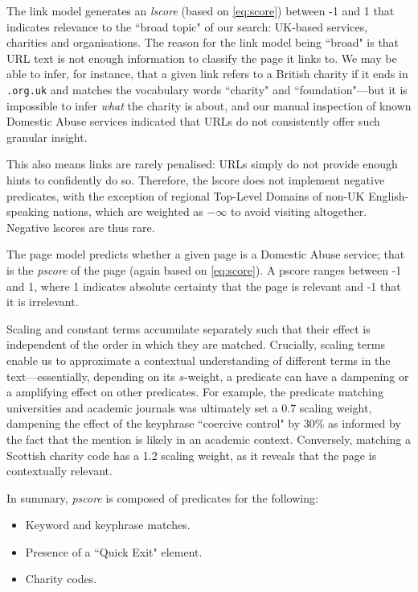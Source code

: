 \documentclass[conference]{IEEEtran}
\begin{document}
The link model generates an \textit{lscore} (based on \cref{eq:score}) between -1 and 1 that indicates relevance to the ``broad topic" of our search: UK-based services, charities and organisations. 
The reason for the link model being ``broad" is that URL text is not enough information to classify the page it links to. 
We may be able to infer, for instance, that a given link refers to a British charity if it ends in \texttt{.org.uk} and matches the vocabulary words ``charity" and ``foundation"---but it is impossible to infer \textit{what} the charity is about, and our manual inspection of known Domestic Abuse services indicated that URLs do not consistently offer such granular insight.

This also means links are rarely penalised: URLs simply do not provide enough hints to confidently do so. 
Therefore, the lscore does not implement negative predicates, with the exception of regional Top-Level Domains of non-UK English-speaking nations, which are weighted as $-\infty$ to avoid visiting altogether. 
Negative lscores are thus rare.

The page model predicts whether a given page is a Domestic Abuse service; that is the \textit{pscore} of the page (again based on \cref{eq:score}). 
A pscore ranges between -1 and 1, where 1 indicates absolute certainty that the page is relevant and -1 that it is irrelevant.

Scaling and constant terms accumulate separately such that their effect is independent of the order in which they are matched. Crucially, scaling terms enable us to approximate a contextual understanding of different terms in the text---essentially, depending on its $s$-weight, a predicate can have a dampening or a amplifying effect on other predicates. For example, the predicate matching universities and academic journals was ultimately set a 0.7 scaling weight, dampening the effect of the keyphrase ``coercive control" by 30\% as informed by the fact that the mention is likely in an academic context. Conversely, matching a Scottish charity code has a 1.2 scaling weight, as it reveals that the page is contextually relevant.

In summary, \textit{pscore} is composed of predicates for the following:
\begin{itemize}
    \item Keyword and keyphrase matches.
    \item Presence of a ``Quick Exit" element.
    \item Charity codes.
\end{itemize}
\end{document}
